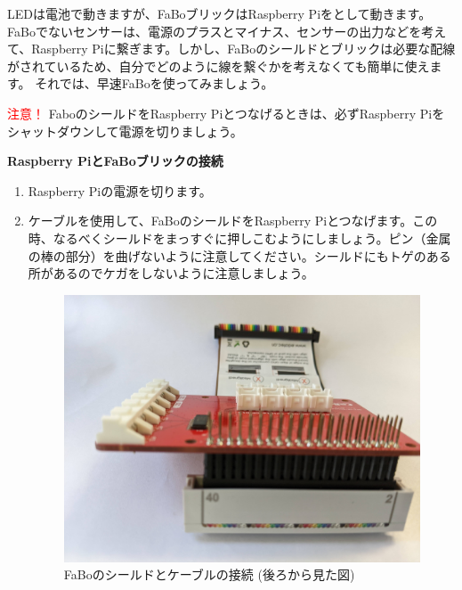 LEDは電池で動きますが、FaBoブリックはRaspberry Piをとして動きます。FaBoでないセンサーは、電源のプラスとマイナス、センサーの出力などを考えて、Raspberry Piに繋ぎます。しかし、FaBoのシールドとブリックは必要な配線がされているため、自分でどのように線を繋ぐかを考えなくても簡単に使えます。
それでは、早速FaBoを使ってみましょう。

\begin{itembox}[c]{\Large\textcolor{red}{注意！}}
  FaboのシールドをRaspberry Piとつなげるときは、必ずRaspberry Piをシャットダウンして電源を切りましょう。
\end{itembox}

\noindent
{\large \bf Raspberry PiとFaBoブリックの接続}
\begin{enumerate}
  \item Raspberry Piの電源を切ります。\\
  \item ケーブルを使用して、FaBoのシールドをRaspberry Piとつなげます。この時、なるべくシールドをまっすぐに押しこむようにしましょう。ピン（金属の棒の部分）を曲げないように注意してください。シールドにもトゲのある所があるのでケガをしないように注意しましょう。\\
  \begin{minipage}[b]{0.4\linewidth}
    \begin{figure}[H]
      \centering
      \includegraphics[width=.8\hsize]{images/chap05/fabo_and_cable_rearview.jpg}
      \caption{FaBoのシールドとケーブルの接続 (後ろから見た図)}
    \end{figure}
  \end{minipage}
  \begin{minipage}[b]{0.4\linewidth}
    \begin{figure}[H]
      \centering

\end{figure}
\end{minipage}
\end{enumerate}
